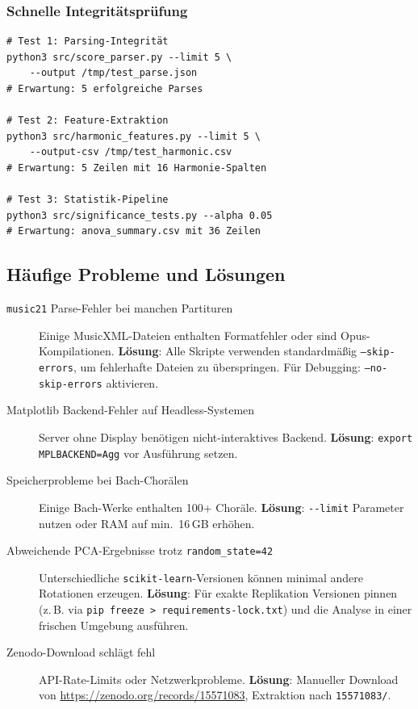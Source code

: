 \documentclass[10pt,a4paper]{article}
\theoremstyle{definition}
\begin{document}
\subsubsection{Schnelle Integritätsprüfung}

\begin{lstlisting}
# Test 1: Parsing-Integrität
python3 src/score_parser.py --limit 5 \
    --output /tmp/test_parse.json
# Erwartung: 5 erfolgreiche Parses

# Test 2: Feature-Extraktion
python3 src/harmonic_features.py --limit 5 \
    --output-csv /tmp/test_harmonic.csv
# Erwartung: 5 Zeilen mit 16 Harmonie-Spalten

# Test 3: Statistik-Pipeline
python3 src/significance_tests.py --alpha 0.05
# Erwartung: anova_summary.csv mit 36 Zeilen
\end{lstlisting}

\subsection{Häufige Probleme und Lösungen}

\begin{description}
    \item[\texttt{music21} Parse-Fehler bei manchen Partituren] Einige MusicXML-Dateien enthalten Formatfehler oder sind Opus-Kompilationen. \textbf{Lösung}: Alle Skripte verwenden standardmäßig \texttt{--skip-errors}, um fehlerhafte Dateien zu überspringen. Für Debugging: \texttt{--no-skip-errors} aktivieren.
    
    \item[Matplotlib Backend-Fehler auf Headless-Systemen] Server ohne Display benötigen nicht-interaktives Backend. \textbf{Lösung}: \texttt{export MPLBACKEND=Agg} vor Ausführung setzen.
    
    \item[Speicherprobleme bei Bach-Chorälen] Einige Bach-Werke enthalten 100+ Choräle. \textbf{Lösung}: \texttt{-{}-limit} Parameter nutzen oder RAM auf min.\ 16\,GB erhöhen.
    
    \item[Abweichende PCA-Ergebnisse trotz \texttt{random\_state=42}] Unterschiedliche \texttt{scikit-learn}-Versionen können minimal andere Rotationen erzeugen. \textbf{Lösung}: Für exakte Replikation Versionen pinnen (z.\,B. via \texttt{pip freeze > requirements-lock.txt}) und die Analyse in einer frischen Umgebung ausführen.
    
    \item[Zenodo-Download schlägt fehl] API-Rate-Limits oder Netzwerkprobleme. \textbf{Lösung}: Manueller Download von \url{https://zenodo.org/records/15571083}, Extraktion nach \texttt{15571083/}.
\end{description}
\end{document}
